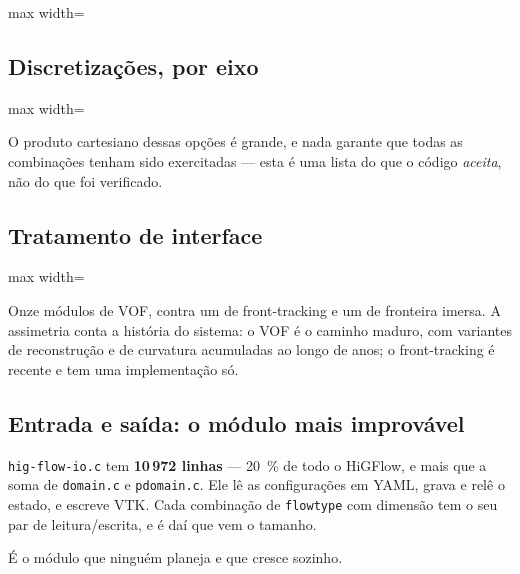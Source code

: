 \begin{adjustbox}{max width=\linewidth}
\end{adjustbox}

\subsection{Discretiza\c{c}\~oes, por eixo}

\begin{adjustbox}{max width=\linewidth}
\end{adjustbox}

O produto cartesiano dessas op\c{c}\~oes \'e grande, e nada garante que todas as
combina\c{c}\~oes tenham sido exercitadas --- esta \'e uma lista do que o c\'odigo
\emph{aceita}, n\~ao do que foi verificado.

\subsection{Tratamento de interface}

\begin{adjustbox}{max width=\linewidth}
\end{adjustbox}

Onze m\'odulos de VOF, contra um de front-tracking e um de fronteira imersa. A
assimetria conta a hist\'oria do sistema: o VOF \'e o caminho maduro, com
variantes de reconstru\c{c}\~ao e de curvatura acumuladas ao longo de anos; o
front-tracking \'e recente e tem uma implementa\c{c}\~ao s\'o.

\subsection{Entrada e sa\'ida: o m\'odulo mais improv\'avel}

\texttt{hig-flow-io.c} tem \textbf{10\,972 linhas} --- \SI{20}{\percent} de todo o
HiGFlow, e mais que a soma de \texttt{domain.c} e \texttt{pdomain.c}. Ele l\^e as
configura\c{c}\~oes em YAML, grava e rel\^e o estado, e escreve VTK. Cada
combina\c{c}\~ao de \texttt{flowtype} com dimens\~ao tem o seu par de
leitura/escrita, e \'e da\'i que vem o tamanho.

\'E o m\'odulo que ningu\'em planeja e que cresce sozinho.
